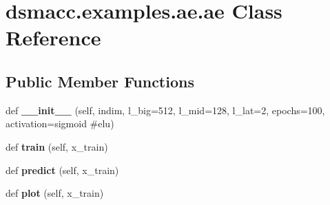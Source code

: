 \hypertarget{classdsmacc_1_1examples_1_1ae_1_1ae}{}\section{dsmacc.\+examples.\+ae.\+ae Class Reference}
\label{classdsmacc_1_1examples_1_1ae_1_1ae}
\subsection*{Public Member Functions}
\begin{DoxyCompactItemize}
\item 
\mbox{\label{classdsmacc_1_1examples_1_1ae_1_1ae_ad37f147dbbfe813efbf1bd184404d5d8}} 
def {\bfseries \+\_\+\+\_\+init\+\_\+\+\_\+} (self, indim, l\+\_\+big=512, l\+\_\+mid=128, l\+\_\+lat=2, epochs=100, activation=\textquotesingle{}sigmoid\textquotesingle{} \#elu)
\item 
\mbox{\label{classdsmacc_1_1examples_1_1ae_1_1ae_ab1f71d4adcf4f9ac7115fa8db12f42d1}} 
def {\bfseries train} (self, x\+\_\+train)
\item 
\mbox{\label{classdsmacc_1_1examples_1_1ae_1_1ae_a9652a5754657b2765d0022e78648480f}} 
def {\bfseries predict} (self, x\+\_\+train)
\item 
\mbox{\label{classdsmacc_1_1examples_1_1ae_1_1ae_a5919d83c18355b55602608947a84bbc0}} 
def {\bfseries plot} (self, x\+\_\+train)
\end{DoxyCompactItemize}
